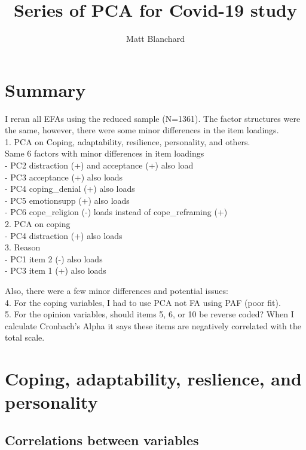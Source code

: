\documentclass[]{article}
\title{Series of PCA for Covid-19 study}
\author{Matt Blanchard}
\date{}
\begin{document}
\maketitle

\hypertarget{summary}{%
\section{Summary}\label{summary}}

I reran all EFAs using the reduced sample (N=1361). The factor
structures were the same, however, there were some minor differences in
the item loadings.\\
1. PCA on Coping, adaptability, resilience, personality, and others.\\
Same 6 factors with minor differences in item loadings\\
- PC2 distraction (+) and acceptance (+) also load\\
- PC3 acceptance (+) also loads\\
- PC4 coping\_denial (+) also loads\\
- PC5 emotionsupp (+) also loads\\
- PC6 cope\_religion (-) loads instead of cope\_reframing (+)\\
2. PCA on coping\\
- PC4 distraction (+) also loads\\
3. Reason\\
- PC1 item 2 (-) also loads\\
- PC3 item 1 (+) also loads

Also, there were a few minor differences and potential issues:\\
4. For the coping variables, I had to use PCA not FA using PAF (poor
fit).\\
5. For the opinion variables, should items 5, 6, or 10 be reverse coded?
When I calculate Cronbach's Alpha it says these items are negatively
correlated with the total scale.

\newpage

\hypertarget{coping-adaptability-reslience-and-personality}{%
\section{Coping, adaptability, reslience, and
personality}\label{coping-adaptability-reslience-and-personality}}

\hypertarget{correlations-between-variables}{%
\subsection{Correlations between
variables}\label{correlations-between-variables}}
\end{document}

